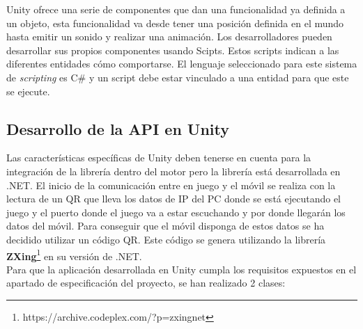 Unity ofrece una serie de componentes que dan una funcionalidad ya definida a un objeto, esta funcionalidad va desde tener una posici\'on definida en el mundo hasta emitir un sonido y realizar una animaci\'on. Los desarrolladores pueden desarrollar sus propios componentes usando Scipts. Estos scripts indican a las diferentes entidades c\'omo comportarse. El lenguaje seleccionado para este sistema de \textit{scripting} es C\# y un script debe estar vinculado a una entidad para que este se ejecute. \\

\subsection {Desarrollo de la API en Unity}

Las caracter\'isticas espec\'ificas de Unity deben tenerse en cuenta para la integraci\'on de la librer\'ia dentro del motor pero la librer\'ia est\'a desarrollada en .NET. El inicio de la comunicaci\'on entre en juego y  el m\'ovil se realiza con la lectura de un QR que lleva los datos de IP del PC donde se est\'a ejecutando el juego y el puerto donde el juego va a estar escuchando y por donde llegar\'an los datos del m\'ovil. Para conseguir que el m\'ovil disponga de estos datos se ha decidido utilizar un c\'odigo QR. Este c\'odigo se genera utilizando la librer\'ia \textbf{ZXing}\footnote{https://archive.codeplex.com/?p=zxingnet} en su versi\'on de .NET. \\

Para que la aplicaci\'on desarrollada en Unity cumpla los requisitos expuestos en el apartado de especificaci\'on del proyecto, se han realizado 2 clases:

